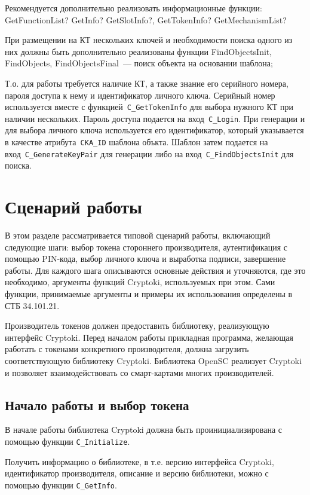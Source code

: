 Рекомендуется дополнительно реализовать информационные функции:
GetFunctionList? GetInfo? GetSlotInfo?, GetTokenInfo? GetMechanismList?

При размещении на КТ нескольких ключей и необходимости поиска одного из 
них должны быть дополнительно реализованы функции FindObjectsInit, FindObjects, 
FindObjectsFinal~--- поиск объекта на основании шаблона;

Т.о. для работы требуется наличие КТ, а также знание его
серийного номера, пароля доступа к нему и идентификатор личного ключа.
Серийный номер используется вместе с функцией~\verb|C_GetTokenInfo|
для выбора нужного КТ при наличии нескольких.
Пароль доступа подается на вход~\verb|C_Login|.
При генерации и для выбора личного ключа
используется его идентификатор, который указывается
в качестве атрибута~\verb|CKA_ID| шаблона объкта.
Шаблон затем подается на вход~\verb|C_GenerateKeyPair|
для генерации либо на вход~\verb|C_FindObjectsInit| для
поиска.
\fi

\section{Сценарий работы}

В этом разделе рассматривается типовой сценарий работы,
включающий следующие шаги: выбор токена стороннего
производителя, аутентификация с помощью PIN-кода, выбор
личного ключа и выработка подписи, завершение работы.
Для каждого шага описываются основные действия и
уточняются, где это необходимо, аргументы функций Cryptoki,
используемых при этом.
Сами функции, принимаемые аргументы и примеры
их использования определены в СТБ 34.101.21.

Производитель токенов должен предоставить библиотеку,
реализующую интерфейс Cryptoki. Перед началом работы прикладная
программа, желающая работать с токенами конкретного
производителя, должна загрузить соответствующую библиотеку
Cryptoki. Библиотека OpenSC реализует Cryptoki и позволяет
взаимодействовать со смарт-картами многих производителей.

\subsection{Начало работы и выбор токена}

В начале работы библиотека Cryptoki должна быть
проинициализирована с помощью функции \verb|C_Initialize|.

Получить информацию о библиотеке, в т.е. версию интерфейса
Cryptoki, идентификатор производителя, описание и версию
библиотеки, можно с помощью функции \verb|C_GetInfo|.

